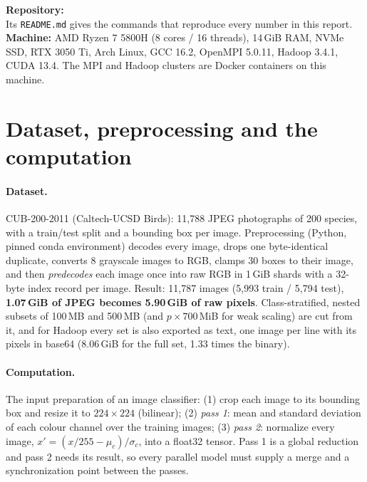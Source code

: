 \documentclass{zc-ust-hw}
\begin{document}
\maketitle

\noindent\textbf{Repository:} \repo\\
Its \texttt{README.md} gives the commands that reproduce every number in this report.\\
\textbf{Machine:} AMD Ryzen 7 5800H (8 cores / 16 threads), 14\,GiB RAM, NVMe SSD, RTX 3050 Ti,
Arch Linux, GCC 16.2, OpenMPI 5.0.11, Hadoop 3.4.1, CUDA 13.4. The MPI and Hadoop clusters are
Docker containers on this machine.

\section{Dataset, preprocessing and the computation}

\paragraph{Dataset.} CUB-200-2011 (Caltech-UCSD Birds): 11{,}788 JPEG photographs of 200
species, with a train/test split and a bounding box per image. Preprocessing (Python, pinned
conda environment) decodes every image, drops one byte-identical duplicate, converts 8 grayscale
images to RGB, clamps 30 boxes to their image, and then \emph{predecodes} each image once into
raw RGB in 1\,GiB shards with a 32-byte index record per image. Result: 11{,}787 images
(5{,}993 train / 5{,}794 test), \textbf{1.07\,GiB of JPEG becomes 5.90\,GiB of raw pixels}.
Class-stratified, nested subsets of 100\,MB and 500\,MB (and $p\times700$\,MiB for weak scaling)
are cut from it, and for Hadoop every set is also exported as text, one image per line with its
pixels in base64 (8.06\,GiB for the full set, 1.33 times the binary).

\paragraph{Computation.} The input preparation of an image classifier: (1) crop each image to
its bounding box and resize it to $224\times224$ (bilinear); (2) \emph{pass 1}: mean and standard
deviation of each colour channel over the training images; (3) \emph{pass 2}: normalize every
image, $x'=(x/255-\mu_c)/\sigma_c$, into a float32 tensor. Pass 1 is a global reduction and pass
2 needs its result, so every parallel model must supply a merge and a synchronization point
between the passes.
\end{document}
